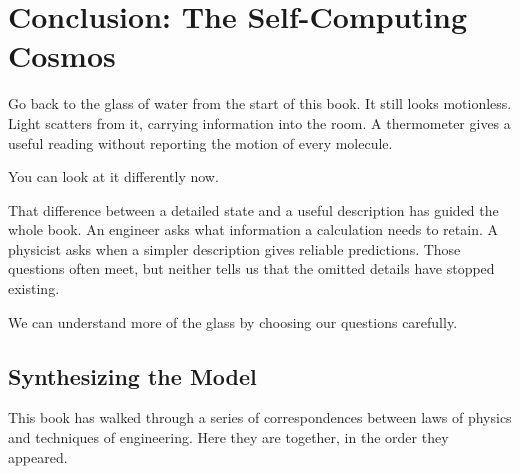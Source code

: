 \chapter*{Conclusion: The Self-Computing Cosmos}

Go back to the glass of water from the start of this book. It still looks motionless. Light scatters from it, carrying information into the room. A thermometer gives a useful reading without reporting the motion of every molecule.

You can look at it differently now.

That difference between a detailed state and a useful description has guided the whole book. An engineer asks what information a calculation needs to retain. A physicist asks when a simpler description gives reliable predictions. Those questions often meet, but neither tells us that the omitted details have stopped existing.

We can understand more of the glass by choosing our questions carefully.

\section{Synthesizing the Model}

This book has walked through a series of correspondences between laws of physics and techniques of engineering. Here they are together, in the order they appeared.

